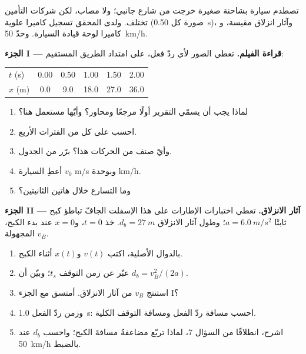 \begin{problem}
\label{pb:g12:kinematics-2d:1}
تصطدم سيارة بشاحنة صغيرة خرجت من شارع جانبي؛ ولا مصاب،
لكن شركات التأمين تختلف. ولدى المحقق تسجيل كاميرا علوية
(صورة كل \qty{0.50}{s})، وآثار انزلاق مقيسة، و
كاميرا لوحة قيادة السيارة. وحدّ  \qty{50}{km/h}.

\medskip
\noindent\textbf{الجزء I --- قراءة الفيلم.}
تعطي الصور  لأي ردّ فعل، على امتداد الطريق المستقيم:
\begin{center}\small
\begin{tabular}{lccccc}
$t$ (\unit{s}) & 0.00 & 0.50 & 1.00 & 1.50 & 2.00\\
$x$ (\unit{m}) & 0.0 & 9.0 & 18.0 & 27.0 & 36.0
\end{tabular}
\end{center}
\begin{enumerate}
  \item لماذا يجب أن يسمّي التقرير أولًا مرجعًا ومحاور؟ وأيّها
        مستعمل هنا؟
  \item احسب  على كل من الفترات الأربع.
  \item وأيّ صنف من الحركات هذا؟ برّر من الجدول.
  \item أعطِ  السيارة $v_0$  \unit{m/s} وبوحدة \unit{km/h}.
  \item وما التسارع خلال هاتين الثانيتين؟
\end{enumerate}

\medskip
\noindent\textbf{الجزء II --- آثار الانزلاق.}
تعطي اختبارات الإطارات على هذا الإسفلت الجافّ تباطؤ كبح ثابتًا
$a = \qty{6.0}{m/s^2}$؛ وطول آثار الانزلاق $d_b = \qty{27}{m}$.
خذ $t = 0$، و$x = 0$ عند بدء الكبح،  المجهولة $v_B$.
\begin{enumerate}[resume]
  \item بالدوال الأصلية، اكتب $v(t)$ و$x(t)$ أثناء الكبح.
  \item عبّر عن زمن التوقف $t_s$؛ وبيّن أن $d_b = v_B^2/(2a)$.
  \item استنتج $v_B$ من آثار الانزلاق. أمتسق مع الجزء I؟
  \item وزمن ردّ الفعل \qty{1.0}{s}: احسب مسافة
        ردّ الفعل ومسافة التوقف الكلية.
  \item اشرح، انطلاقًا من السؤال 7، لماذا تربّع مضاعفةُ 
        مسافةَ الكبح؛ واحسب $d_b$ عند \qty{50}{km/h} بالضبط.
\end{enumerate}


\end{problem}
